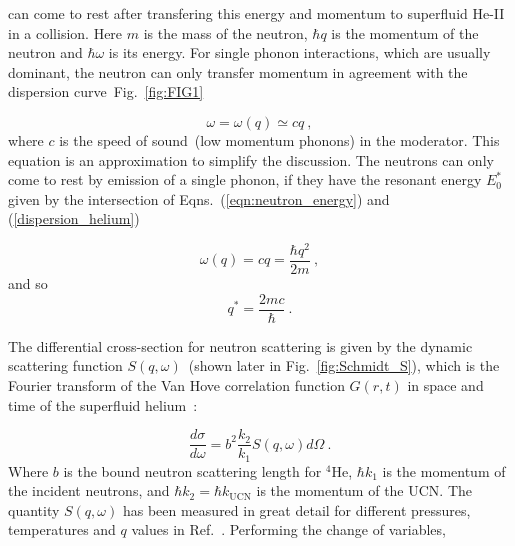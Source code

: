can come to rest after transfering this energy and momentum to superfluid He-II in
a collision. Here $m$ is the mass of the neutron, $\hbar q$ is the
momentum of the neutron and $\hbar \omega$ is its energy.
For single phonon interactions, which are usually dominant, the
neutron can only transfer momentum in agreement with the dispersion
curve~Fig.~\ref{fig:FIG1}

\begin{equation}
\label{dispersion_helium}
\omega=\omega(q) \simeq cq~,
\end{equation}
where $c$ is the speed of sound~(low momentum phonons) in the
moderator. This equation is an approximation to simplify the
discussion. The neutrons can only come to rest by emission of a single
phonon, if they have the resonant energy $E_0^*$ given by the
intersection of Eqns.~(\ref{eqn:neutron_energy}) and
(\ref{dispersion_helium})

\begin{equation}
\omega(q)=cq=\frac{\hbar q^2}{2m}~,
\end{equation}
and so
\begin{equation}
q^*=\frac{2mc}{\hbar}~.
\end{equation}


The differential cross-section for neutron scattering is given by the
dynamic scattering function $S(q,\omega)$~(shown later in
Fig.~\ref{fig:Schmidt_S}), which is the Fourier transform of the Van
Hove correlation function $G(r,t)$ in space and time of the superfluid
helium~\cite{Squires}:

\begin{equation}
\frac{d\sigma}{d\omega}=b^2 \frac{k_2}{k_1}S(q,\omega) d\Omega~.
\end{equation}
Where $b$ is the bound neutron scattering length for $^4$He,
$\hbar k_1$ is the momentum of the incident neutrons, and
$\hbar k_2=\hbar k_{\text{UCN}}$ is the momentum of the UCN. The
quantity $S(q,\omega)$ has been measured in great detail for different
pressures, temperatures and $q$ values in
Ref.~\cite{S_func1,gibbs1999collective,S_func3}. Performing the change
of variables,

